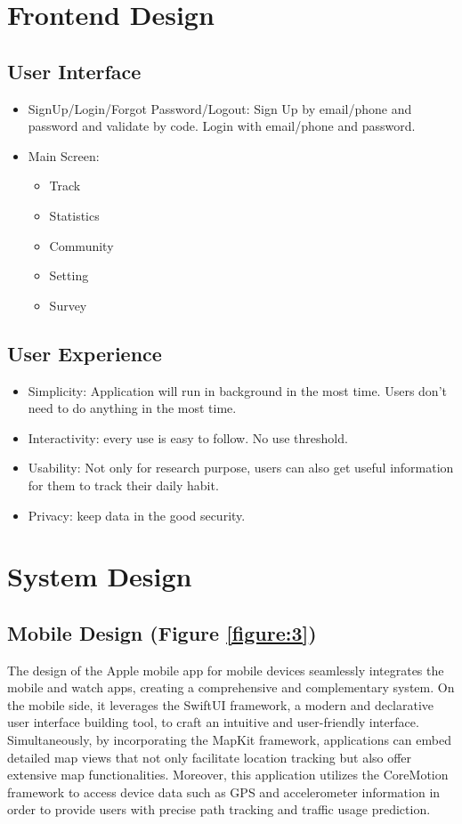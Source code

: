 \documentclass[12pt,two side]{report}
\begin{document}
\section{Frontend Design}
\subsection{User Interface}
\begin{itemize}
    \item SignUp/Login/Forgot Password/Logout: Sign Up by email/phone and password and validate by code. Login with email/phone and password.
    \item Main Screen:
        \begin{itemize}
            \item Track
            \item Statistics
            \item Community
            \item Setting
            \item Survey
        \end{itemize}
\end{itemize}
\subsection{User Experience}
\begin{itemize}
    \item Simplicity: Application will run in background in the most time. Users don’t need to do anything in the most time.
    \item Interactivity: every use is easy to follow. No use threshold.
    \item Usability: Not only for research purpose, users can also get useful information for them to track their daily habit.
    \item Privacy: keep data in the good security.
\end{itemize}


\section{System Design}
\subsection{Mobile Design (Figure \ref{figure:3})}
The design of the Apple mobile app for mobile devices seamlessly integrates the mobile and watch apps, creating a comprehensive and complementary system. On the mobile side, it leverages the SwiftUI framework, a modern and declarative user interface building tool, to craft an intuitive and user-friendly interface. Simultaneously, by incorporating the MapKit framework, applications can embed detailed map views that not only facilitate location tracking but also offer extensive map functionalities. Moreover, this application utilizes the CoreMotion framework to access device data such as GPS and accelerometer information in order to provide users with precise path tracking and traffic usage prediction.\newline
\end{document}
